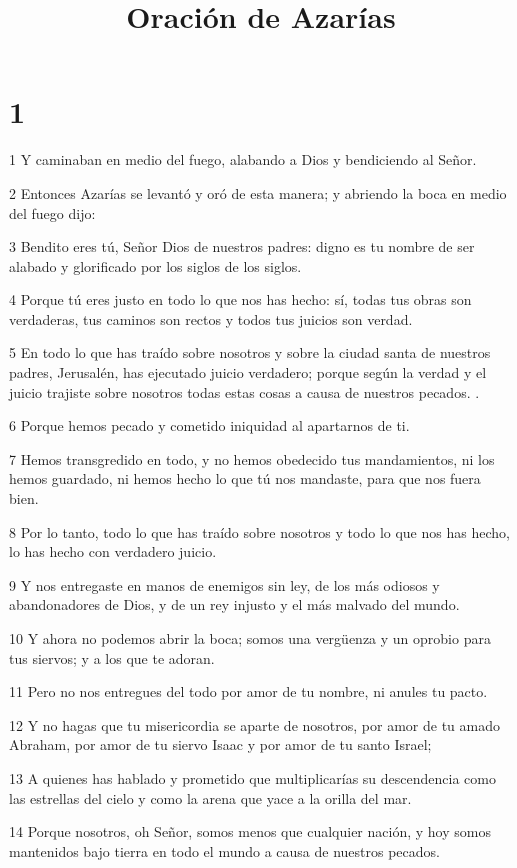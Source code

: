 

\title{Oración de Azarías}


\chapter{1}

\par 1 Y caminaban en medio del fuego, alabando a Dios y bendiciendo al Señor.
\par 2 Entonces Azarías se levantó y oró de esta manera; y abriendo la boca en medio del fuego dijo:
\par 3 Bendito eres tú, Señor Dios de nuestros padres: digno es tu nombre de ser alabado y glorificado por los siglos de los siglos.
\par 4 Porque tú eres justo en todo lo que nos has hecho: sí, todas tus obras son verdaderas, tus caminos son rectos y todos tus juicios son verdad.
\par 5 En todo lo que has traído sobre nosotros y sobre la ciudad santa de nuestros padres, Jerusalén, has ejecutado juicio verdadero; porque según la verdad y el juicio trajiste sobre nosotros todas estas cosas a causa de nuestros pecados. .
\par 6 Porque hemos pecado y cometido iniquidad al apartarnos de ti.
\par 7 Hemos transgredido en todo, y no hemos obedecido tus mandamientos, ni los hemos guardado, ni hemos hecho lo que tú nos mandaste, para que nos fuera bien.
\par 8 Por lo tanto, todo lo que has traído sobre nosotros y todo lo que nos has hecho, lo has hecho con verdadero juicio.
\par 9 Y nos entregaste en manos de enemigos sin ley, de los más odiosos y abandonadores de Dios, y de un rey injusto y el más malvado del mundo.
\par 10 Y ahora no podemos abrir la boca; somos una vergüenza y un oprobio para tus siervos; y a los que te adoran.
\par 11 Pero no nos entregues del todo por amor de tu nombre, ni anules tu pacto.
\par 12 Y no hagas que tu misericordia se aparte de nosotros, por amor de tu amado Abraham, por amor de tu siervo Isaac y por amor de tu santo Israel;
\par 13 A quienes has hablado y prometido que multiplicarías su descendencia como las estrellas del cielo y como la arena que yace a la orilla del mar.
\par 14 Porque nosotros, oh Señor, somos menos que cualquier nación, y hoy somos mantenidos bajo tierra en todo el mundo a causa de nuestros pecados.
